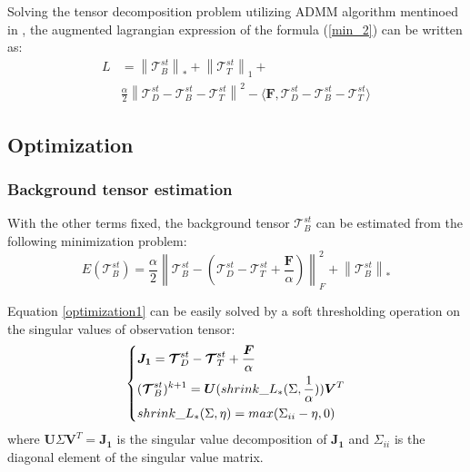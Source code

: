 \documentclass[journal]{IEEEtran}
\begin{document}
Solving the tensor decomposition problem utilizing ADMM algorithm mentinoed in \cite{dai2017reweighted}, the augmented lagrangian expression of the formula (\ref{min_2}) can be written as:
\begin{equation}
  \begin{split}
    L & = \left \|\bm{\mathcal T}_B^{st} \right \| _* +\left \|\bm{\mathcal T}_T^{st} \right \| _1 + \\
    & \frac{\alpha}{2} \left \|\bm{\mathcal T}_D^{st}-\bm{\mathcal T}_B^{st}-\bm{\mathcal T}_T^{st} \right \| ^2 - \langle \bm{F},\bm{\mathcal T}_D^{st}-\bm{\mathcal T}_B^{st}-\bm{\mathcal T}_T^{st} \rangle
  \end{split}
\end{equation}

\subsection{Optimization}
\subsubsection{Background tensor estimation}
With the other terms fixed, the background tensor $\bm{\mathcal T}_B^{st}$ can be estimated from the following minimization problem:
\begin{equation}
  E(\bm{\mathcal T}_B^{st})=\frac{\alpha}{2} \left \|\bm{\mathcal T}_B^{st}-(\bm{\mathcal T}_D^{st}-\bm{\mathcal T}_T^{st}+\frac{\bm{F}}{\alpha}) \right \|_F^2 + \left \|\bm{\mathcal T}_B^{st} \right \| _*
  \label{optimization1}
\end{equation}

Equation \ref{optimization1} can be easily solved by a soft thresholding operation on the singular values of observation tensor\cite{cai2010singular}:
\begin{equation}
  \begin{dcases}
    \bm{J_1}=\bm{\mathcal T}_D^{st}-\bm{\mathcal T}_T^{st}+\frac{\bm{F}}{\alpha}\\
    (\bm{\mathcal T}_B^{st})^{k+1}=\bm{U}(shrink\_L_{*}(\Sigma,\frac{1}{\alpha}))\bm{V}^{T}\\
    shrink\_L_{*}(\Sigma,\eta)=max(\Sigma_{ii}-\eta,0)
  \end{dcases}
\end{equation}
where $\bm{U}\Sigma\bm{V}^{T}=\bm{J_1}$ is the singular value decomposition of $\bm{J_1}$ and $\Sigma_{ii}$ is the diagonal element of the singular value matrix.
\end{document}
